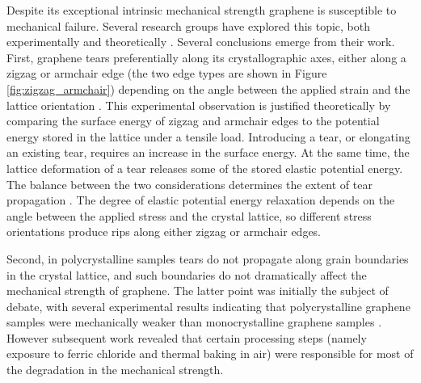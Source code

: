 \documentclass[edeposit,fullpage,draftthesis]{uiucthesis2009}
\begin{document}
        Despite its exceptional intrinsic mechanical strength graphene is susceptible to mechanical failure.
        Several research groups have explored this topic, both experimentally
        \cite{huang2011grains, ruiz2011softened, lee2013high} and theoretically 
        \cite{zhao2010temperature, wang2012effect, terdalkar2010nanoscale}.
        Several conclusions emerge from their work. First, graphene tears preferentially along its 
        crystallographic axes, either along a zigzag or armchair edge (the two edge types are shown
        in Figure \ref{fig:zigzag_armchair}) depending
        on the angle between the applied strain and the lattice orientation \cite{kim2011ripping}. 
        This experimental observation is justified theoretically by comparing the surface
        energy of zigzag and armchair edges to the potential energy stored in the lattice under a tensile load.
        Introducing a tear, or elongating an existing tear, requires an increase in the surface energy.
        At the same time, the lattice deformation of a tear releases some of the stored elastic
        potential energy. The balance between the two considerations determines the extent of tear propagation
        \cite{griffith1921phenomena}.
        The degree of elastic potential energy relaxation depends on the angle between the applied stress and
        the crystal lattice, so different stress orientations produce rips along either zigzag or armchair edges.
        
        Second, in polycrystalline samples tears do not propagate along grain boundaries in the crystal lattice, and such
        boundaries do not dramatically affect the mechanical strength of graphene. The latter point
        was initially the subject of debate, with several experimental results indicating that polycrystalline
        graphene samples  were mechanically weaker than monocrystalline graphene samples \cite{huang2011grains,ruiz2011softened}.
        However subsequent work \cite{lee2013high, rasool2013measurement} revealed that certain processing steps 
        (namely exposure to 
        ferric chloride and thermal baking in air) were responsible for most of the degradation in the mechanical strength.
        
        
\end{document}

